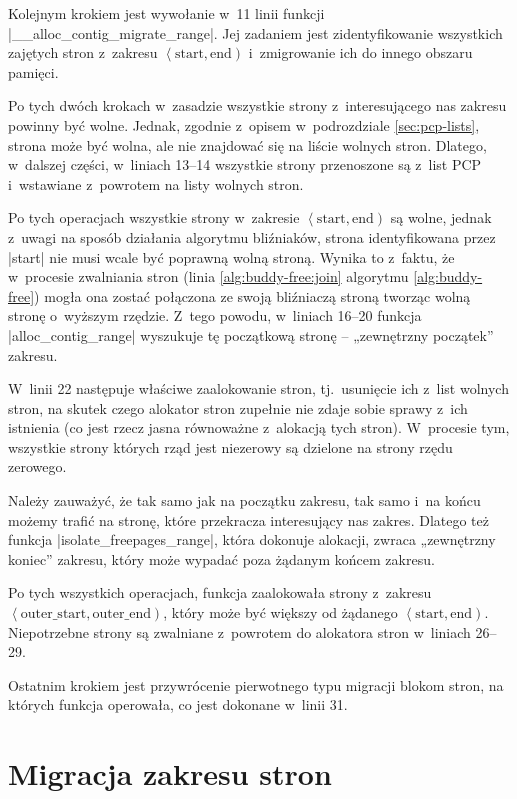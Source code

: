 Kolejnym krokiem jest wywołanie w~11 linii funkcji
\code|__alloc_contig_migrate_range|.  Jej zadaniem jest
zidentyfikowanie wszystkich zajętych stron z~zakresu
$\left<\mathrm{start}, \mathrm{end}\right)$ i~zmigrowanie ich do
innego obszaru pamięci.

Po tych dwóch krokach w~zasadzie wszystkie strony z~interesującego nas
zakresu powinny być wolne.  Jednak, zgodnie z~opisem w~podrozdziale
\ref{sec:pcp-lists}, strona może być wolna, ale nie znajdować się na
liście wolnych stron.  Dlatego, w~dalszej części, w~liniach 13--14
wszystkie strony przenoszone są z~list PCP i~wstawiane z~powrotem na
listy wolnych stron.

Po tych operacjach wszystkie strony w~zakresie $\left<\mathrm{start},
\mathrm{end}\right)$ są wolne, jednak z~uwagi na sposób działania
algorytmu bliźniaków, strona identyfikowana przez \code|start|
nie musi wcale być poprawną wolną stroną.  Wynika to z~faktu, że
w~procesie zwalniania stron (linia \ref{alg:buddy-free:join} algorytmu
\ref{alg:buddy-free}) mogła ona zostać połączona ze swoją bliźniaczą
stroną tworząc wolną stronę o~wyższym rzędzie.  Z~tego powodu,
w~liniach 16--20 funkcja \code|alloc_contig_range| wyszukuje tę
początkową stronę -- „zewnętrzny początek” zakresu.

W~linii 22 następuje właściwe zaalokowanie stron, tj.\ usunięcie ich
z~list wolnych stron, na skutek czego alokator stron zupełnie nie
zdaje sobie sprawy z~ich istnienia (co jest rzecz jasna równoważne
z~alokacją tych stron).  W~procesie tym, wszystkie strony których rząd
jest niezerowy są dzielone na strony rzędu zerowego.

Należy zauważyć, że tak samo jak na początku zakresu, tak samo i~na
końcu możemy trafić na stronę, które przekracza interesujący nas
zakres.  Dlatego też funkcja \code|isolate_freepages_range|,
która dokonuje alokacji, zwraca „zewnętrzny koniec” zakresu, który
może wypadać poza żądanym końcem zakresu.

Po tych wszystkich operacjach, funkcja zaalokowała strony z~zakresu
$\left<\mathrm{outer\_start}, \mathrm{outer\_end}\right)$, który może
być większy od żądanego $\left<\mathrm{start}, \mathrm{end}\right)$.
Niepotrzebne strony są zwalniane z~powrotem do alokatora stron
w~liniach 26--29.

Ostatnim krokiem jest przywrócenie pierwotnego typu migracji blokom
stron, na których funkcja operowała, co jest dokonane w~linii 31.


\section{Migracja zakresu stron}\label{sec:alloc-contig-migrate-range}

